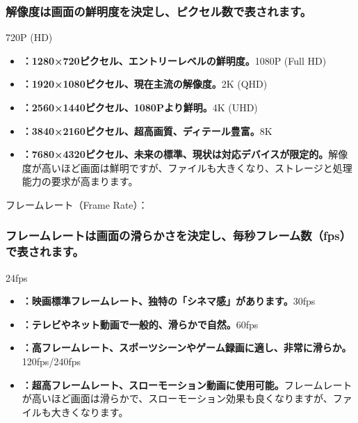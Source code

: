 


\subsubsection*{解像度は画面の鮮明度を決定し、ピクセル数で表されます。}

720P (HD)

\begin{itemize}
  \item \textbf{：1280×720ピクセル、エントリーレベルの鮮明度。}1080P (Full HD)
  \item \textbf{：1920×1080ピクセル、現在主流の解像度。}2K (QHD)
  \item \textbf{：2560×1440ピクセル、1080Pより鮮明。}4K (UHD)
  \item \textbf{：3840×2160ピクセル、超高画質、ディテール豊富。}8K
  \item \textbf{：7680×4320ピクセル、未来の標準、現状は対応デバイスが限定的。}解像度が高いほど画面は鮮明ですが、ファイルも大きくなり、ストレージと処理能力の要求が高まります。
\end{itemize}

フレームレート（Frame Rate）：

\subsubsection*{フレームレートは画面の滑らかさを決定し、毎秒フレーム数（fps）で表されます。}

24fps

\begin{itemize}
  \item \textbf{：映画標準フレームレート、独特の「シネマ感」があります。}30fps
  \item \textbf{：テレビやネット動画で一般的、滑らかで自然。}60fps
  \item \textbf{：高フレームレート、スポーツシーンやゲーム録画に適し、非常に滑らか。}120fps/240fps
  \item \textbf{：超高フレームレート、スローモーション動画に使用可能。}フレームレートが高いほど画面は滑らかで、スローモーション効果も良くなりますが、ファイルも大きくなります。
\end{itemize}

